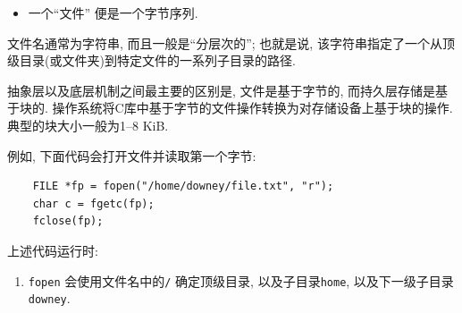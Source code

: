 \documentclass[12pt]{book}
\begin{document}
{\begin{itemize}
\item  一个``文件'' 便是一个字节序列.

\end{itemize}
%
%
文件名通常为字符串, 而且一般是``分层次的'';
也就是说, 该字符串指定了一个从顶级目录(或文件夹)到特定文件的一系列子目录的路径.

抽象层以及底层机制之间最主要的区别是, 文件是基于字节的, 而持久层存储是基于块的.
操作系统将C库中基于字节的文件操作转换为对存储设备上基于块的操作.
典型的块大小一般为1--8 KiB.

例如, 下面代码会打开文件并读取第一个字节:

\begin{verbatim}
    FILE *fp = fopen("/home/downey/file.txt", "r");
    char c = fgetc(fp);
    fclose(fp);
\end{verbatim}

上述代码运行时:

\begin{enumerate}

%
%
\item {\tt fopen} 会使用文件名中的\verb"/" 确定顶级目录, 
  以及子目录{\tt home}, 以及下一级子目录 {\tt downey}.


\end{enumerate}}
\end{document}
